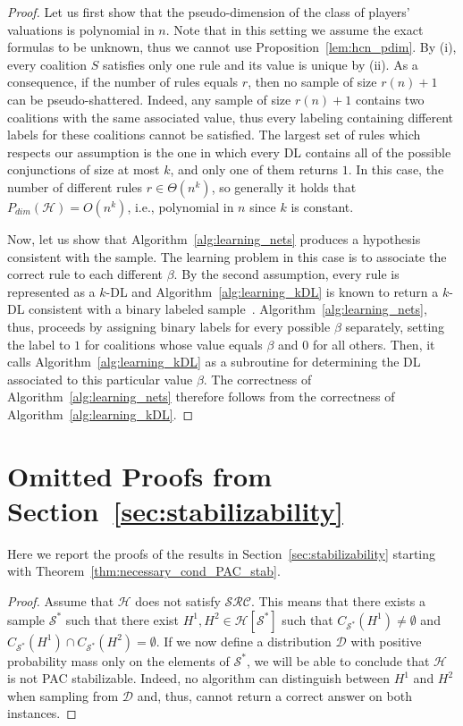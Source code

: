 \documentclass[letterpaper]{article} %
\newcommand{\distribution}{\mathcal{D}}
\newcommand{\hclass}{\ensuremath{\mathcal{H}}}
\newcommand{\sample}{\ensuremath{\mathcal{S}}}
\begin{document}
\hcnDecisionLists*
\begin{proof}
Let us first show that the pseudo-dimension of the class of players' valuations is polynomial in $n$. Note that in this setting we assume the exact formulas to be unknown, thus we cannot use Proposition~\ref{lem:hcn_pdim}. By (i), every coalition $S$ satisfies only one rule and its value is unique by (ii). As a consequence, if the number of rules equals $r$, then no sample of size $r(n)+1$ can be pseudo-shattered. Indeed, any sample of size $r(n)+1$ contains two coalitions with the same associated value, thus every labeling containing different labels for these coalitions cannot be satisfied. The largest set of rules which respects our assumption is the one in which every DL contains all of the possible conjunctions of size at most $k$, and only one of them returns $1$. 
In this case, the number of different rules $r\in\Theta(n^k)$, so generally it holds that $P_{dim}(\hclass)=O(n^k)$, i.e., polynomial in $n$ since $k$ is constant.

Now, let us show that Algorithm~\ref{alg:learning_nets} produces a hypothesis consistent with the sample. The learning problem in this case is to associate the correct rule to each different $\beta$. By the second assumption, every rule is represented as a $k$-DL and Algorithm~\ref{alg:learning_kDL} is known to return a $k$-DL consistent with a binary labeled sample~\cite{Rivest87}. Algorithm~\ref{alg:learning_nets}, thus, proceeds by assigning binary labels for every possible $\beta$ separately, setting the label to $1$ for coalitions whose value equals $\beta$ and $0$ for all others. Then, it calls Algorithm~\ref{alg:learning_kDL} as a subroutine for determining the DL associated to this particular value $\beta$. The correctness of Algorithm~\ref{alg:learning_nets} therefore follows from the correctness of Algorithm~\ref{alg:learning_kDL}.
\end{proof}

\section{Omitted Proofs from Section~\ref{sec:stabilizability}}
Here we report the proofs of the results in Section~\ref{sec:stabilizability} starting with Theorem~\ref{thm:necessary_cond_PAC_stab}.

\necessaryCondPACStab*
\begin{proof}
Assume that $\mathcal{H}$ does not satisfy $\mathcal{SRC}$. This means that there exists a sample $\sample^*$ such that there exist $H^1, H^2 \in \mathcal{H}[\sample^*]$ such that $C_{\sample^*}(H^1)\neq \emptyset$ and $C_{\sample^*}(H^1) \cap C_{\sample^*}(H^2)=\emptyset$. If we now define a distribution $\mathcal{D}$ with positive probability mass only on the elements of $\mathcal{S}^*$, we will be able to conclude that $\mathcal{H}$ is not PAC stabilizable. Indeed, no algorithm can distinguish between $H^1$ and $H^2$ when sampling from $\distribution$ and, thus, cannot return a correct answer on both instances.
\end{proof}
\end{document}

